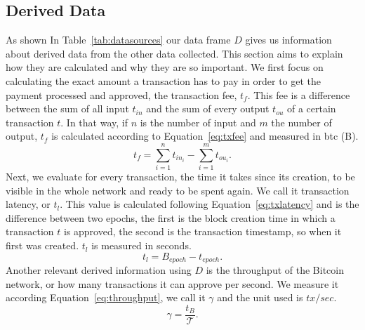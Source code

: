 \documentclass[USenglish]{uit-thesis}
\def\bitcoin{\leavevmode\rlap{\hskip.5pt-}B}
\begin{document}
\subsection{Derived Data}
As shown In Table~\ref{tab:datasources} our data frame $D$ gives
us information about derived data from the other data
collected. This section aims to explain how they are
calculated and why they are so important. We first focus on
calculating the exact amount a transaction has to pay in order to
get the payment processed and approved, the transaction fee,
$t_f$. This fee is a difference between the sum of all
input $t_{in}$ and the sum of every output $t_{ou}$ of a certain transaction $t$.
In that way, if $n$ is the number of input and $m$ the number of output,
$t_f$ is calculated according to Equation~\ref{eq:txfee} and measured
in \gls{btc} (\bitcoin).
\begin{equation}
\label{eq:txfee}
t_f = \sum_{i = 1}^{n}t_{in_i} - \sum_{i = 1}^{m} t_{ou_i}.
\end{equation}
Next, we evaluate for every transaction, the time it takes since its
creation, to be visible in the whole network and ready to be spent again.
We call it transaction latency, or $t_l$. This value is calculated following
Equation~\ref{eq:txlatency} and is the difference between two epochs,
the first is the block creation time in which
a transaction $t$ is approved, the second is the transaction
timestamp, so when it first was created. $t_l$ is measured in
seconds.
\begin{equation}
\label{eq:txlatency}
t_l = B_{epoch} - t_{epoch}.
\end{equation}
Another relevant derived information using $D$ is the throughput
of the Bitcoin network, or how many transactions it can approve
per second. We measure it according Equation~\ref{eq:throughput},
we call it $\gamma$ and the unit used is $tx/sec$.
\begin{equation}
\label{eq:throughput}
\gamma = \frac{t_B}{\mathcal{T}}.
\end{equation}
\end{document}

